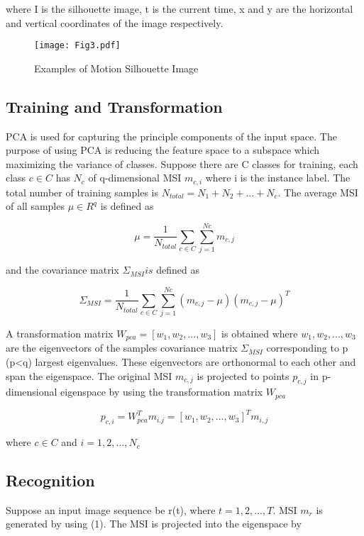 \documentclass{style1}
\begin{document}
where I is the silhouette image, t is the current time, x and y are the horizontal and vertical coordinates of the image respectively.

\begin{figure}[ht!]
\centering\texttt{[image: Fig3.pdf]}
\caption{Examples of Motion Silhouette Image}
\label{fig:3}
\end{figure}
\subsection{Training and Transformation}
PCA is used for capturing the principle components of the input space. The purpose of using PCA is reducing the feature space to a subspace which maximizing the variance of classes. Suppose there are C classes for training, each class $c \in C$ has $N_c$ of q-dimensional MSI $m_{c,i}$ where i is the instance label. The total number of training samples is $N_{total} = N_1 + N_2 + ...+ N_c$. The average MSI of all samples $\mu \in R^q$ is defined as

\begin{equation}
\mu = \frac{1}{N_{total}} \sum \limits_{c \in C}  \sum \limits_{j = 1}^{Nc} m_{c,j}
\label{eq:2}
\end{equation}

and the covariance matrix $\Sigma_{MSI} is$ defined as

\begin{equation}
\Sigma_{MSI} = \frac{1}{N_{total}}\sum \limits_{c \in C}  \sum \limits_{j = 1}^{Nc} (m_{c,j} - \mu)(m_{c,j} - \mu)^T
\label{eq:3}
\end{equation}

A transformation matrix $W_{pca} = [w_1, w_2,..., w_3]$ is obtained where $w_1, w_2,..., w_3$ are the eigenvectors of the samples covariance matrix $\Sigma_{MSI}$ corresponding to p (p<q) largest eigenvalues. These eigenvectors are orthonormal to each other and span the eigenspace.
The original MSI $m_{c,j}$ is projected to points $p_{c,j}$ in p-dimensional eigenspace by using the transformation matrix $W_{pca}$

\begin{equation}
p_{c,i} = W_{pca}^T m_{i.j} = [w_1, w_2,..., w_3]^Tm_{i,j}
\label{eq:4}
\end{equation}

where $c \in C$ and $i = 1,2,...,N_c$
\subsection{Recognition}
Suppose an input image sequence be r(t), where $t=1,2,...,T$. MSI $m_r$ is generated by using (1). The MSI is projected into the eigenspace by 
\end{document}
